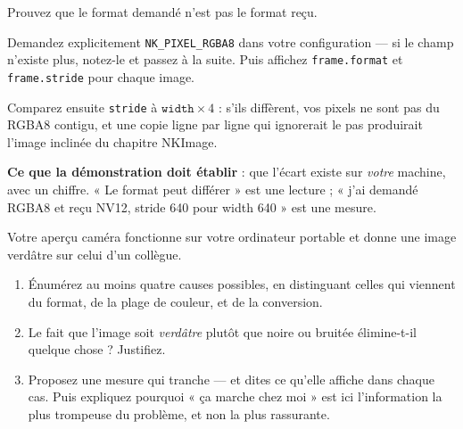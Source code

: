 \begin{nkdemo}
Prouvez que le format demandé n'est pas le format reçu.

Demandez explicitement \texttt{NK\_PIXEL\_RGBA8} dans votre configuration ---
si le champ n'existe plus, notez-le et passez à la suite. Puis affichez
\texttt{frame.format} et \texttt{frame.stride} pour chaque image.

Comparez ensuite \texttt{stride} à $\texttt{width} \times 4$ : s'ils diffèrent,
vos pixels ne sont pas du RGBA8 contigu, et une copie ligne par ligne qui
ignorerait le pas produirait l'image inclinée du chapitre NKImage.

\textbf{Ce que la démonstration doit établir} : que l'écart existe sur
\emph{votre} machine, avec un chiffre. « Le format peut différer » est une
lecture ; « j'ai demandé RGBA8 et reçu NV12, stride 640 pour width 640 » est une
mesure.
\end{nkdemo}

\begin{nklogique}
Votre aperçu caméra fonctionne sur votre ordinateur portable et donne une image
verdâtre sur celui d'un collègue.

\begin{enumerate}
\item Énumérez au moins quatre causes possibles, en distinguant celles qui
      viennent du format, de la plage de couleur, et de la conversion.
\item Le fait que l'image soit \emph{verdâtre} plutôt que noire ou bruitée
      élimine-t-il quelque chose ? Justifiez.
\item Proposez une mesure qui tranche --- et dites ce qu'elle affiche dans chaque
      cas. Puis expliquez pourquoi « ça marche chez moi » est ici l'information
      la plus trompeuse du problème, et non la plus rassurante.
\end{enumerate}
\end{nklogique}
